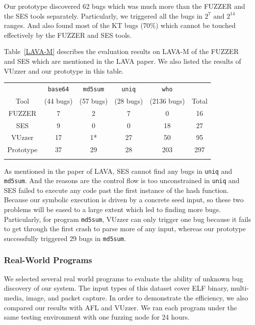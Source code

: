 Our prototype discovered 62 bugs which was much more than the FUZZER and the SES tools separately. Particularly, we triggered all the bugs in $2^7$ and $2^{14}$ ranges. And also found most of the KT bugs (70\%) which cannot be touched effectively by the FUZZER and SES tools. 

Table~\ref{LAVA-M} describes the evaluation results on LAVA-M of the FUZZER and SES which are mentioned in the LAVA paper. We also listed the results of VUzzer and our prototype in this table. 
\begin{table}[!b]
{\begin{tabular*}{20pc}{@{\extracolsep{\fill}}cccccc@{}}\toprule
	     & \texttt{base64} & \texttt{md5sum} & \texttt{uniq} & \texttt{who} &   \\
	     Tool    & (44 bugs) & (57 bugs) & (28 bugs) & (2136 bugs) &  Total\\
\midrule
		FUZZER 		& 7  & 2  & 7    & 0   & 16  \\
		SES	        & 9  & 0  & 0    & 18  & 27  \\
		VUzzer		& 17 & 1* & 27   & 50  & 95 \\
		Prototype	& 37 & 29 & 28   & 203 & 297 \\
\botrule
\end{tabular*}}{}
\end{table}


As mentioned in the paper of LAVA, SES cannot find any bugs in \texttt{uniq} and \texttt{md5sum}. And the reasons are the control flow is too unconstrained in \texttt{uniq} and SES failed to execute any code past the first instance of the hash function. Because our symbolic execution is driven by a concrete seed input, so these two problems will be eased to a large extent which led to finding more bugs. Particularly, for program \texttt{md5sum}, VUzzer can only trigger one bug because it fails to get through the first crash to parse more of any input, whereas our prototype successfully triggered 29 bugs in \texttt{md5sum}.

\subsubsection{Real-World Programs}
We selected several real world programs to evaluate the ability of unknown bug discovery of our system. The input types of this dataset cover ELF binary, multi-media, image, and packet capture. In order to demonstrate the efficiency, we also compared our results with AFL and VUzzer. We ran each program under the same testing environment with one fuzzing node for 24 hours. 

